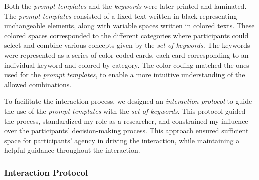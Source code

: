 \documentclass[sn-mathphys, Numbered]{sn-jnl}%
\theoremstyle{thmstyleone}%
\theoremstyle{thmstyletwo}%
\theoremstyle{thmstylethree}%
\begin{document}
Both the \textit{prompt templates} and the \textit{keywords} were later printed and laminated. The \textit{prompt templates} consisted of a fixed text written in black representing unchangeable elements, along with variable spaces written in colored texts. These colored spaces corresponded to the different categories where participants could select and combine various concepts given by the \textit{set of keywords.} The keywords were represented as a series of color-coded cards, each card corresponding to an individual keyword and colored by category. The color-coding matched the ones used for the \textit{prompt templates}, to enable a more intuitive understanding of the allowed combinations.

To facilitate the interaction process, we designed an \textit{interaction protocol} to guide the use of the \textit{prompt templates} with the \textit{set of keywords}. This protocol guided the process, standardized my role as a researcher, and constrained my influence over the participants' decision-making process. This approach ensured sufficient space for participants' agency in driving the interaction, while maintaining a helpful guidance throughout the interaction.

\subsubsection*{Interaction Protocol}
\end{document}
